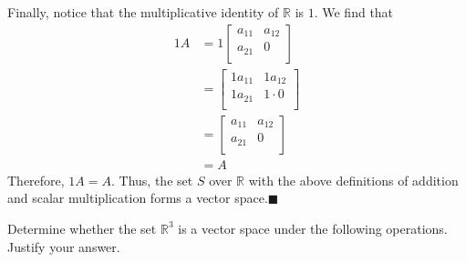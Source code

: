 \documentclass{article}
\newcommand{\R}{\mathbb{R}} %
\begin{document}
Finally, notice that the multiplicative identity of \(\mathbb{R} \) is \(1\). We find that 
\begin{align*}
  1A&=1\begin{bmatrix}
    a_{11}  &a_{12}    \\
     a_{21} &0    \\
  \end{bmatrix}\\
  &=\begin{bmatrix}
    1a_{11}  &1a_{12}    \\
     1a_{21} &1\cdot0    \\
  \end{bmatrix}\\
  &=\begin{bmatrix}
    a_{11}  &a_{12}    \\
     a_{21} &0    \\
  \end{bmatrix}\\
  &=A
\end{align*}
Therefore, \(1A=A\). Thus, the set \(S\) over \(\mathbb{R} \) with the above definitions of addition and scalar multiplication forms a vector space.\hfill\(\blacksquare\) 

\newpage
{} Determine whether the set $\R^3$ is a vector space under the following operations.  Justify your answer. 
\end{document}
